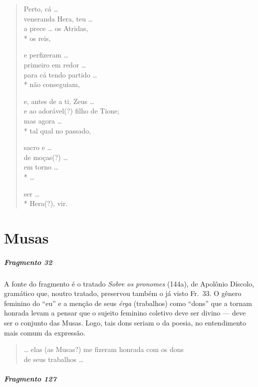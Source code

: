 \begin{verse}
Perto, cá \ldots{}\\
veneranda Hera, teu \ldots{}\\
a prece \ldots{} os Atridas,\\*
os reis,

e perfizeram \ldots{}\\
primeiro em redor \ldots{}\\
para cá tendo partido \ldots{}\\*
não conseguiam,

e, antes de a ti, Zeus \ldots{}\\
e ao adorável(?) filho de Tione;\\
mas agora \ldots{}\\*
tal qual no passado,

sacro e \ldots{}\\
de moças(?) \ldots{}\\
em torno \ldots{}\\*
\ldots{}

ser \ldots{}\\*
Hera(?), vir.
\end{verse}

\chapter{Musas}

\paragraph{Fragmento 32}

{\small A fonte do fragmento é o tratado \textit{Sobre os pronomes} (144a), de Apolônio
Díscolo, gramático que, noutro tratado, preservou também o já visto Fr.~33. O
gênero feminino do “eu” e a menção de seus \textit{érga }(trabalhos) como
``dons” que a tornam honrada levam a pensar que o sujeito feminino
coletivo deve ser divino --- deve ser o conjunto das Musas. Logo, tais dons
seriam o da poesia, no entendimento mais comum da expressão.}

\begin{verse}
\ldots{} elas (as Musas?) me fizeram honrada com \qb{}os dons\\
de seus trabalhos \ldots{}
\end{verse}


\paragraph{Fragmento 127}

